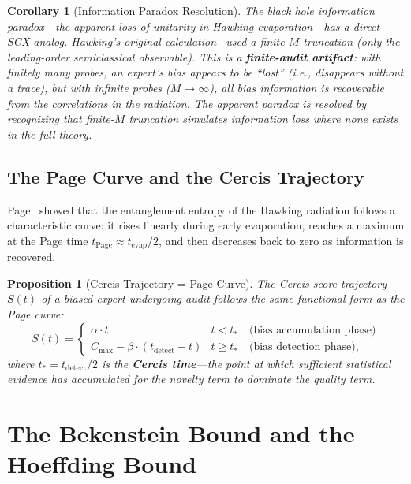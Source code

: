 \documentclass[12pt,a4paper]{article}
\newtheorem{proposition}[theorem]{Proposition}
\newtheorem{corollary}[theorem]{Corollary}
\theoremstyle{remark}
\newcommand{\SCX}{\textsf{SCX}}
\newcommand{\Cercis}{\textsf{Cercis}}
\begin{document}
\begin{corollary}[Information Paradox Resolution]
\label{cor:info_paradox}
The black hole information paradox---the apparent loss of unitarity in Hawking evaporation---has a direct \SCX{} analog. Hawking's original calculation~\cite{hawking1976black} used a finite-$M$ truncation (only the leading-order semiclassical observable). This is a \textbf{finite-audit artifact}: with finitely many probes, an expert's bias appears to be ``lost'' (i.e., disappears without a trace), but with infinite probes ($M \to \infty$), all bias information is recoverable from the correlations in the radiation. The apparent paradox is resolved by recognizing that finite-$M$ truncation simulates information loss where none exists in the full theory.
\end{corollary}

\subsection{The Page Curve and the Cercis Trajectory}

Page~\cite{page1993information} showed that the entanglement entropy of the Hawking radiation follows a characteristic curve: it rises linearly during early evaporation, reaches a maximum at the Page time $t_{\text{Page}} \approx t_{\text{evap}}/2$, and then decreases back to zero as information is recovered.

\begin{proposition}[Cercis Trajectory = Page Curve]
\label{prop:page_cercis}
The \Cercis{} score trajectory $S(t)$ of a biased expert undergoing audit follows the same functional form as the Page curve:
\begin{equation}
  S(t) = \begin{cases}
    \alpha \cdot t & t < t_* \quad \text{(bias accumulation phase)} \\[4pt]
    C_{\max} - \beta \cdot (t_{\text{detect}} - t) & t \geq t_* \quad \text{(bias detection phase)},
  \end{cases}
\end{equation}
where $t_* = t_{\text{detect}}/2$ is the \textbf{Cercis time}---the point at which sufficient statistical evidence has accumulated for the novelty term to dominate the quality term.
\end{proposition}


\section{The Bekenstein Bound and the Hoeffding Bound}
\label{sec:bekenstein}
\end{document}
